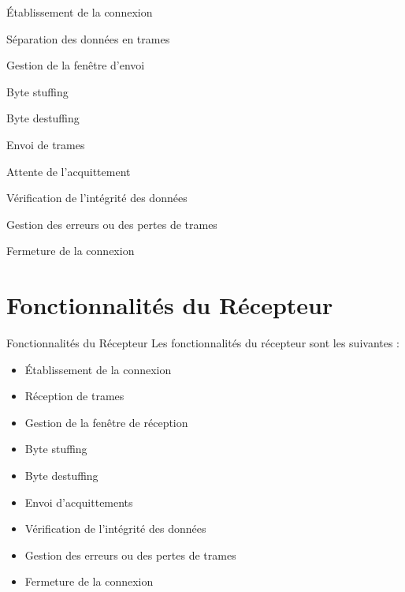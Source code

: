 \documentclass{beamer}
\begin{document}
\begin{frame}{Établissement de la connexion}
\end{frame}

\begin{frame}{Séparation des données en trames} 
\end{frame}

\begin{frame}{Gestion de la fenêtre d'envoi} 
\end{frame} 

\begin{frame}{Byte stuffing} 
\end{frame}

\begin{frame}{Byte destuffing}
\end{frame}

\begin{frame}{Envoi de trames} 
\end{frame} 


\begin{frame}{Attente de l'acquittement} 
\end{frame} 
\begin{frame}{Vérification de l'intégrité des données} 
\end{frame}

\begin{frame}{Gestion des erreurs ou des pertes de trames} 
\end{frame}

\begin{frame}{Fermeture de la connexion} 
\end{frame}




\section{Fonctionnalités du Récepteur}
\begin{frame}{Fonctionnalités du Récepteur}
  Les fonctionnalités du récepteur sont les suivantes : 
  \begin{itemize}
    \item Établissement de la connexion 
    \item Réception de trames
    \item Gestion de la fenêtre de réception
    \item Byte stuffing 
    \item Byte destuffing
    \item Envoi d'acquittements
    \item Vérification de l'intégrité des données 
    \item Gestion des erreurs ou des pertes de trames 
    \item Fermeture de la connexion
  \end{itemize}

\end{frame}
\end{document}
